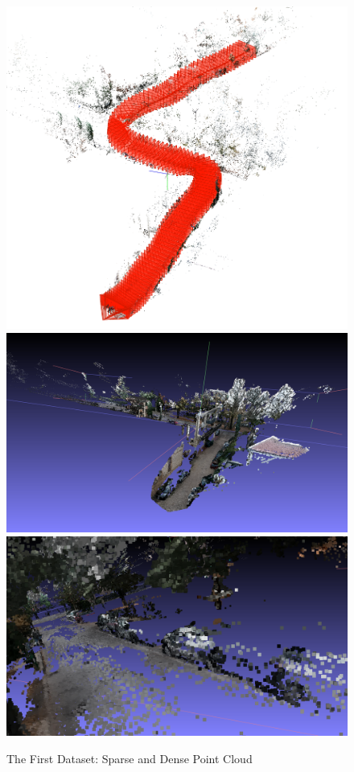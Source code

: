 \documentclass[11pt]{article}
\begin{document}
    \begin{figure}
    \caption{The First Dataset: Sparse and Dense Point Cloud}
    \centering
    \includegraphics[width=\textwidth,height=\textheight,keepaspectratio]{images/1.ply.sparse.png}
    \includegraphics[width=\textwidth,height=\textheight,keepaspectratio]{images/1.ply.dense.1.png}
    \includegraphics[width=\textwidth,height=\textheight,keepaspectratio]{images/1.ply.dense.2.png}

\end{figure}
\end{document}
